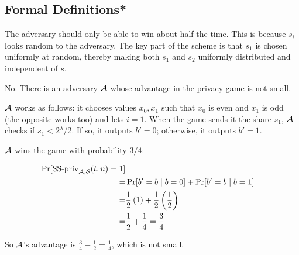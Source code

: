 \subsection{Formal Definitions*}
\begin{sampleA}
    The adversary should only be able to win about half the time. This is 
    because $s_i$ looks random to the adversary. The key part of the scheme 
    is that $s_1$ is chosen uniformly at random, thereby making both $s_1$ 
    and $s_2$ uniformly distributed and independent of $s$.
\end{sampleA}

\begin{answer}
    No. There is an adversary $\mathcal{A}$ whose advantage in the privacy game 
    is not small. 
    
    $\mathcal{A}$ works as follows: it chooses values $x_0, x_1$ such that $x_0$ 
    is even and $x_1$ is odd (the opposite works too) and lets $i=1$. 
    When the game sends it the share $s_1$, $\mathcal{A}$ checks if $s_1 < 2^\lambda/2$. 
    If so, it outputs $b'=0$; otherwise, it outputs $b'=1$.

    $\mathcal{A}$ wins the game with probability $3/4$:

    \begin{align*}
        \Pr[\text{SS-priv}_{\mathcal{A},\mathcal{S}}(t,n) = 1] \\
        =& \Pr[b'=b \mid b=0] + \Pr[b'=b \mid b=1]\\
        =& \frac{1}{2}\left(1\right) + \frac{1}{2}\left(\frac{1}{2}\right)\\
        =& \frac{1}{2} + \frac{1}{4} = \frac{3}{4}
    \end{align*}
    \smallskip

    So $\mathcal{A}$'s advantage is $\frac{3}{4}-\frac{1}{2} = \frac{1}{4}$, which 
    is not small.
\end{answer}

